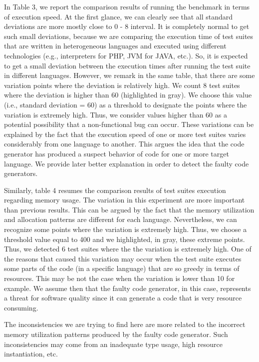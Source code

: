 In Table 3, we report the comparison results of running the benchmark in terms of execution speed. At the first glance, we can clearly see that all standard deviations are more mostly close to 0 - 8 interval. It is completely normal to get such small deviations, because we are comparing the execution time of test suites that are written in heterogeneous languages and executed using different technologies (e.g., interpreters for PHP, JVM for JAVA, etc.). So, it is expected to get a small deviation between the execution times after running the test suite in different languages. However, we remark in the same table, that there are some variation points where the deviation is relatively high. We count 8 test suites where the deviation is higher than 60 (highlighted in gray). We choose this value (i.e., standard deviation = 60) as a threshold to designate the points where the variation is extremely high. Thus, we consider values higher than 60 as a potential possibility that a non-functional bug can occur. These variations can be explained by the fact that the execution speed of one or more test suites varies considerably from one language to another. This argues the idea that the code generator has produced a suspect behavior of code for one or more target language. We provide later better explanation in order to detect the faulty code generators.

Similarly, table 4 resumes the comparison results of test suites execution regarding memory usage. The variation in this experiment are more important than previous results. This can be argued by the fact that the memory utilization and allocation patterns are different for each language. Nevertheless, we can recognize some points where the variation is extremely high. Thus, we choose a threshold value equal to 400 and we highlighted, in gray, these extreme points. Thus, we detected 6 test suites where the the variation is extremely high. 
One of the reasons that caused this variation may occur when the test suite executes some parts of the code (in a specific language) that are so greedy in terms of resources. This may be not the case when the variation is lower than 10 for example.
We assume then that the faulty code generator, in this case, represents a threat for software quality since it can generate a code that is very resource consuming.
 
The inconsistencies we are trying to find here are more related to the incorrect memory utilization patterns produced by the faulty code generator. Such inconsistencies may come from an inadequate type usage, high resource instantiation, etc.





